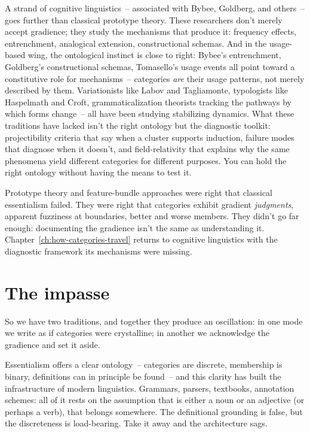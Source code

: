 A strand of cognitive linguistics~-- associated with Bybee, Goldberg, and others~-- goes further than classical prototype theory. These researchers don't merely accept gradience; they study the mechanisms that produce it: frequency effects, entrenchment, analogical extension, constructional schemas. And in the usage-based wing, the ontological instinct is close to right: Bybee's entrenchment, Goldberg's constructional schemas, Tomasello's usage events all point toward a constitutive role for mechanisms~-- categories \emph{are} their usage patterns, not merely described by them. Variationists like Labov and Tagliamonte, typologists like Haspelmath and Croft, grammaticalization theorists tracking the pathways by which forms change~-- all have been studying stabilizing dynamics. What these traditions have lacked isn't the right ontology but the diagnostic toolkit: projectibility criteria that say when a cluster supports induction, failure modes that diagnose when it doesn't, and field-relativity that explains why the same phenomena yield different categories for different purposes. You can hold the right ontology without having the means to test it.

Prototype theory and feature-bundle approaches were right that classical essentialism failed. They were right that categories exhibit gradient \emph{judgments}, apparent fuzziness at boundaries, better and worse members. They didn't go far enough: documenting the gradience isn't the same as understanding it. Chapter~\ref{ch:how-categories-travel} returns to cognitive linguistics with the diagnostic framework its mechanisms were missing.

\section{The impasse}
\label{sec:1:impasse}

So we have two traditions, and together they produce an oscillation: in one mode we write as if categories were crystalline; in another we acknowledge the gradience and set it aside.

Essentialism offers a clear ontology~-- categories are discrete, membership is binary, definitions can in principle be found~-- and this clarity has built the infrastructure of modern linguistics. Grammars, parsers, textbooks, annotation schemes: all of it rests on the assumption that  is either a noun or an adjective (or perhaps a verb), that  belongs somewhere. The definitional grounding is false, but the discreteness is load-bearing. Take it away and the architecture sags.


